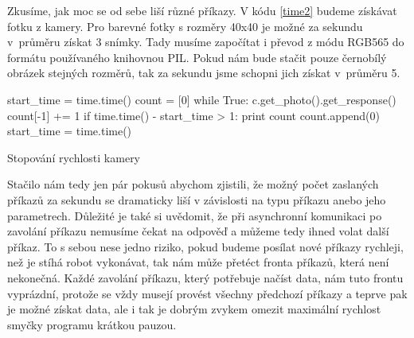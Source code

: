     Zkusíme, jak moc se od sebe liší různé příkazy. V kódu \ref{time2} budeme
    získávat fotku z kamery. Pro barevné fotky s rozměry 40x40 je možné za
    sekundu v~průměru získat 3 snímky. Tady musíme započítat i převod z módu
    RGB565 do formátu používaného knihovnou PIL. Pokud nám bude stačit pouze
    černobílý obrázek stejných rozměrů, tak za sekundu jsme schopni jich získat
    v~průměru 5.

\begin{listing}
\begin{pyc}
start_time = time.time()
count = [0]
while True:
    c.get_photo().get_response()
    count[-1] += 1
    if time.time() - start_time > 1:
        print count
        count.append(0)
        start_time = time.time()
        \end{pyc}
\caption{Stopování rychlosti kamery}
\label{time2}
\end{listing}

    Stačilo nám tedy jen pár pokusů abychom zjistili, že možný počet zaslaných
    příkazů za sekundu se dramaticky liší v závislosti na typu příkazu anebo
    jeho parametrech. Důležité je také si uvědomit, že při asynchronní
    komunikaci po zavolání příkazu nemusíme čekat na odpověď a můžeme tedy
    ihned volat další příkaz. To s sebou nese jedno riziko, pokud budeme
    posílat nové příkazy rychleji, než je stíhá robot vykonávat, tak nám může
    přetéct fronta příkazů, která není nekonečná. Každé zavolání příkazu, který
    potřebuje načíst data, nám tuto frontu vyprázdní, protože se vždy musejí
    provést všechny předchozí příkazy a teprve pak je možné získat data, ale i
    tak je dobrým zvykem omezit maximální rychlost smyčky programu krátkou
    pauzou.
